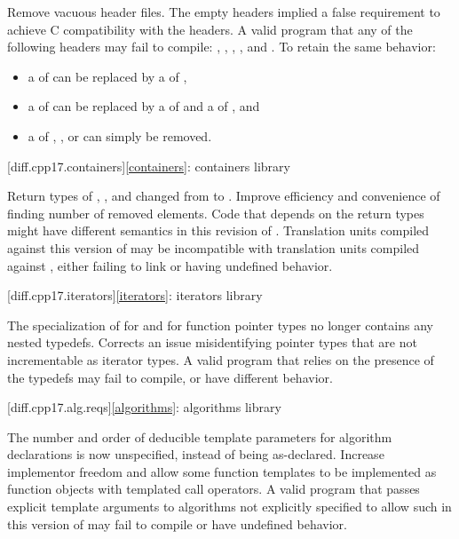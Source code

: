\change
Remove vacuous \Cpp{} header files.
\rationale
The empty headers implied a false requirement to achieve C compatibility with the \Cpp{} headers.
\effect
A valid \CppXVII{} program that  any of the following headers may fail to compile:
,
,
,
, and
.
To retain the same behavior:
\begin{itemize}
\item
a  of  can be replaced by
a  of ,
\item
a  of  can be replaced by
a  of  and
a  of ,
and
\item
a  of
,
, or
can simply be removed.
\end{itemize}

[diff.cpp17.containers]{\ref{containers}: containers library}

\change
Return types of , , and 
changed from  to .
\rationale
Improve efficiency and convenience of finding number of removed elements.
\effect
Code that depends on the return types might have different semantics in this revision of \Cpp{}.
Translation units compiled against this version of \Cpp{} may be incompatible with
translation units compiled against \CppXVII{}, either failing to link or having undefined behavior.

[diff.cpp17.iterators]{\ref{iterators}: iterators library}

\change
The specialization of  for  and
for function pointer types no longer contains any nested typedefs.
\rationale
Corrects an issue misidentifying pointer types that are not incrementable
as iterator types.
\effect
A valid \CppXVII{} program that relies on the presence of the typedefs
may fail to compile, or have different behavior.

[diff.cpp17.alg.reqs]{\ref{algorithms}: algorithms library}

\change
The number and order of deducible template parameters for algorithm declarations
is now unspecified, instead of being as-declared.
\rationale
Increase implementor freedom and allow some function templates
to be implemented as function objects with templated call operators.
\effect
A valid \CppXVII{} program that passes explicit template arguments to
algorithms not explicitly specified to allow such in this version of \Cpp{}
may fail to compile or have undefined behavior.

